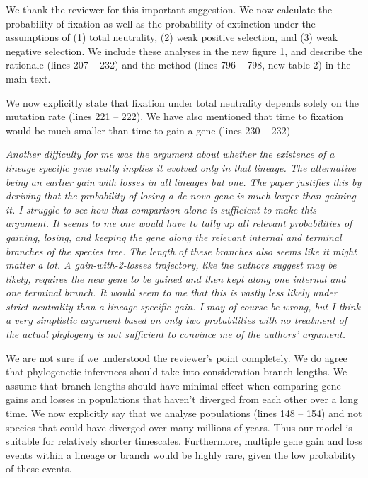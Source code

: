 \documentclass[12pt,a4paper]{article}
\begin{document}
We thank the reviewer for this important suggestion. We now calculate the probability of fixation as well as the probability of extinction under the assumptions of (1) total neutrality, (2) weak positive selection, and (3) weak negative selection. We include these analyses in the new figure 1, and describe the rationale (lines 207 -- 232) and the method (lines 796 -- 798, new table 2) in the main text. 

We now explicitly state that fixation under total neutrality depends solely on the mutation rate (lines 221 -- 222). We have also mentioned that time to fixation would be much smaller than time to gain a gene (lines 230 -- 232)

{\itshape Another difficulty for me was the argument about whether the existence of a lineage specific gene really implies it evolved only in that lineage. The alternative being an earlier gain with losses in all lineages but one. The paper justifies this by deriving that the probability of losing a de novo gene is much larger than gaining it. I struggle to see how that comparison alone is sufficient to make this argument. It seems to me one would have to tally up all relevant probabilities of gaining, losing, and keeping the gene along the relevant internal and terminal branches of the species tree. The length of these branches also seems like it might matter a lot. A gain-with-2-losses trajectory, like the authors suggest may be likely, requires the new gene to be gained and then kept along one internal and one terminal branch. It would seem to me that this is vastly less likely under strict neutrality than a lineage specific gain. I may of course be wrong, but I think a very simplistic argument based on only two probabilities with no treatment of the actual phylogeny is not sufficient to convince me of the authors' argument.}

We are not sure if we understood the reviewer's point completely. We do agree that phylogenetic inferences should take into consideration branch lengths. We assume that branch lengths should have minimal effect when comparing gene gains and losses in populations that haven't diverged from each other over a long time. We now explicitly say that we analyse populations (lines 148 -- 154) and not species that could have diverged over many millions of years. Thus our model is suitable for relatively shorter timescales. Furthermore, multiple gene gain and loss events within a lineage or branch would be highly rare, given the low probability of these events. 
\end{document}
